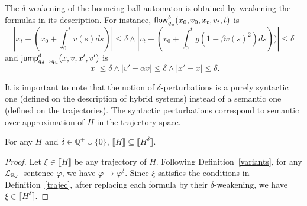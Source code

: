 \documentclass[12pt]{llncs}
\begin{document}
\begin{example}
The $\delta$-weakening of the bouncing ball automaton is obtained by weakening the formulas in its description. For instance, $\mathsf{flow}_{q_u}^{\delta}(x_0, v_0, x_t, v_t, t)$ is
{$$|x_t - (x_0 + \int_0^{t} v(s) ds)|\leq \delta \wedge |v_t - (v_0 + \int_0^t g(1-\beta v(s)^2) ds))|\leq \delta$$}
and $\mathsf{jump}_{q_d \rightarrow q_u}^{\delta} (x, v, x', v')$ is {$$|x|\leq \delta \wedge |v' - \alpha v|\leq \delta \wedge |x'-x|\leq \delta.$$}
\end{example}
\begin{remark} It is important to note that the notion of $\delta$-perturbations is a purely syntactic one (defined on the description of hybrid systems) instead of a semantic one (defined on the trajectories). The syntactic perturbations correspond to semantic over-approximation of $H$ in the trajectory space.
\end{remark}
\begin{proposition} For any $H$ and $\delta\in\mathbb{Q}^+\cup\{0\}$, $\llbracket H\rrbracket\subseteq \llbracket H^{\delta}\rrbracket$.
\end{proposition}
\begin{proof}
Let $\xi\in \llbracket H\rrbracket$ be any trajectory of $H$. Following
Definition~\ref{variants}, for any $\mathcal{L}_{\mathbb{R}_{\mathcal{F}}}$ sentence $\varphi$, we have
$\varphi\rightarrow\varphi^{\delta}$. Since
$\xi$ satisfies the conditions in Definition~\ref{trajec}, after replacing each
formula by their $\delta$-weakening, we have $\xi\in \llbracket H^{\delta}\rrbracket$.
\end{proof}
\end{document}
